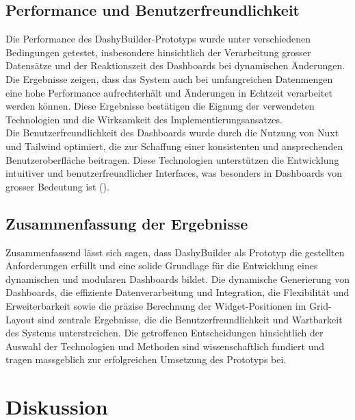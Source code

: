 \documentclass[a4paper, 12pt]{scrartcl}
\begin{document}
\subsection{Performance und Benutzerfreundlichkeit}
Die Performance des DashyBuilder-Prototyps wurde unter verschiedenen Bedingungen getestet, insbesondere hinsichtlich der Verarbeitung grosser Datensätze und der Reaktionszeit des Dashboards bei dynamischen Änderungen. Die Ergebnisse zeigen, dass das System auch bei umfangreichen Datenmengen eine hohe Performance aufrechterhält und Änderungen in Echtzeit verarbeitet werden können. Diese Ergebnisse bestätigen die Eignung der verwendeten Technologien und die Wirksamkeit des Implementierungsansatzes.\\[1em]Die Benutzerfreundlichkeit des Dashboards wurde durch die Nutzung von \ac{Nuxt} und \ac{Tailwind} optimiert, die zur Schaffung einer konsistenten und ansprechenden Benutzeroberfläche beitragen. Diese Technologien unterstützen die Entwicklung intuitiver und benutzerfreundlicher Interfaces, was besonders in Dashboards von grosser Bedeutung ist (\cite{Pastushenko2019}).

\subsection{Zusammenfassung der Ergebnisse}
Zusammenfassend lässt sich sagen, dass DashyBuilder als Prototyp die gestellten Anforderungen erfüllt und eine solide Grundlage für die Entwicklung eines dynamischen und modularen Dashboards bildet. Die dynamische Generierung von Dashboards, die effiziente Datenverarbeitung und Integration, die Flexibilität und Erweiterbarkeit sowie die präzise Berechnung der Widget-Positionen im Grid-Layout sind zentrale Ergebnisse, die die Benutzerfreundlichkeit und Wartbarkeit des Systems unterstreichen. Die getroffenen Entscheidungen hinsichtlich der Auswahl der Technologien und Methoden sind wissenschaftlich fundiert und tragen massgeblich zur erfolgreichen Umsetzung des Prototyps bei.
\clearpage
	\section{Diskussion}
	\label{sec:diskussion}
\end{document}
